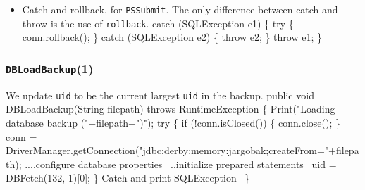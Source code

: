 \documentclass{article}
\def\nwendcode{\endtrivlist \endgroup}
\let\nwdocspar=\par
\theoremstyle{definition}
\begin{document}
\begin{itemize}
\item Catch-and-rollback, for {\tt{}\protect{}PSSubmit}.  The only difference between
catch-and-throw is the use of {\tt{}rollback}.
\nwenddocs{}\endmoddef{}
catch (SQLException e1) \{
  try \{
    conn.rollback();
  \} catch (SQLException e2) \{
    throw e2;
  \}
  throw e1;
\}
\nwendcode{}\nwdocspar
\end{itemize}

\subsubsection{{\tt{}DBLoadBackup}(1)}
We update {\tt{}\protect{}uid} to be the current largest {\tt{}\protect{}uid} in the backup.
\nwenddocs{}\endmoddef{}
public void DBLoadBackup(String filepath) throws RuntimeException \{
  Print("Loading database backup ("+filepath+")");
  try \{
    if (!conn.isClosed()) \{
      conn.close();
    \}
    conn = DriverManager.getConnection("jdbc:derby:memory:jargobak;createFrom="+filepath);
    \LA{}....configure database properties~{\nwtagstyle{}}\RA{}
    \LA{}..initialize prepared statements~{\nwtagstyle{}}\RA{}
    uid = DBFetch(132, 1)[0];
  \}
  \LA{}Catch and print \code{}SQLException\edoc{}~{\nwtagstyle{}}\RA{}
\}
\nwendcode{}\nwdocspar
\end{document}
